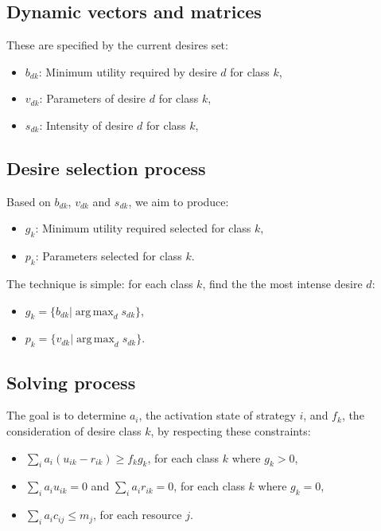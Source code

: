 \documentclass[12pt]{article}
\DeclareMathOperator*{\argmax}{arg\,max}
\begin{document}
\subsection*{Dynamic vectors and matrices} 

These are specified by the current desires set:

\begin{itemize}
	\item $b_{dk}$: Minimum utility required by desire $d$ for class $k$,
	\item $v_{dk}$: Parameters of desire $d$ for class $k$,
	\item $s_{dk}$: Intensity of desire $d$ for class $k$,
\end{itemize}

\subsection*{Desire selection process}

Based on $b_{dk}$, $v_{dk}$ and $s_{dk}$, we aim to produce:

\begin{itemize}
	\item $g_{k}$: Minimum utility required selected for class $k$,
	\item $p_{k}$: Parameters selected for class $k$.
\end{itemize}

The technique is simple: for each class $k$, find the the most intense desire $d$:

\begin{itemize}
	\item $g_{k} = \{ b_{dk} | \argmax_d s_{dk} \} $,
	\item $p_{k} = \{ v_{dk} | \argmax_d s_{dk} \} $. 
\end{itemize}

\subsection*{Solving process}
The goal is to determine $a_{i}$, the activation state of strategy $i$, and
$f_{k}$, the consideration of desire class $k$, by respecting these constraints:

\begin{itemize}
	\item $\sum\limits_i a_i (u_{ik} - r_{ik}) \geq f_k g_k$, for each class $k$
        where $g_k > 0$, 
	\item $\sum\limits_i a_i u_{ik} = 0$ and $\sum\limits_i a_i r_{ik} = 0$, for each class $k$
        where $g_k = 0$, 
	\item $\sum\limits_i a_i c_{ij} \leq m_j$, for each resource $j$.
\end{itemize}
\end{document}
